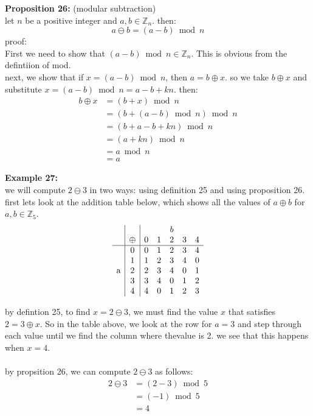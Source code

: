 \documentclass[12pt]{article}
\begin{document}
\vspace{5mm}
\noindent\textbf{Proposition 26:} (modular subtraction)
\\ let $n$ be a positive integer and $a,b \in \mathbb{Z}_n$. then:
\[
a \ominus b = (a-b) \bmod n
\]
proof:
\\First we need to show that $(a-b) \bmod n \in \mathbb{Z}_n$. This is obvious from the defintiion of mod.
\\ next, we show that if $x = (a-b) \bmod n$, then $a = b \oplus x$. so we take $ b \oplus x$ and substitute $x = (a-b) \bmod n =a-b+kn$. then:
\begin{align*}
b \oplus x &= (b + x) \bmod n \\
&= (b + (a-b) \bmod n) \bmod n \\
&= (b + a - b + kn) \bmod n \\
&= (a + kn) \bmod n \\
&= a \bmod n \\
&= a
\end{align*}

\newpage
\noindent\textbf{Example 27:}
\\ we will compute $2 \ominus 3$ in two ways: using definition 25 and using proposition 26.
 first lets look at the addition table below, which shows all the values of $a \oplus b$ for $a,b \in \mathbb{Z}_5$.
\[
\begin{array}{c|c|ccccc}
   &   & \multicolumn{5}{c}{b} \\
   & \oplus & 0 & 1 & 2 & 3 & 4 \\
\hline
\multirow{5}{*}{a} 
 & 0 & 0 & 1 & 2 & 3 & 4 \\
 & 1 & 1 & 2 & 3 & 4 & 0 \\
 & 2 & 2 & 3 & 4 & 0 & 1 \\
 & 3 & 3 & 4 & 0 & 1 & 2 \\
 & 4 & 4 & 0 & 1 & 2 & 3 \\
\end{array}
\]

by defintion 25, to find $x = 2 \ominus 3$, we must find the value $x$ that satisfies $ 2 = 3 \oplus x$. So in the table above, we look at the row for $a=3$ and step through each value until we find the column where thevalue is 2. we see that this happens when $x=4$.
\\
\\by propsition 26, we can compute $2 \ominus 3$ as follows:
\begin{align*}
2 \ominus 3 &= (2-3) \bmod 5 \\
&= (-1) \bmod 5 \\
&= 4
\end{align*}
\end{document}
